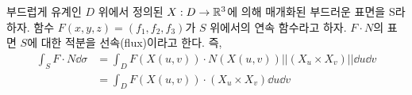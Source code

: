 \begin{definition}[3차원 벡터장의 선속]
부드럽게 유계인 $D$ 위에서 정의된 $X:D\to\mathbb{R}^3$에 의해 매개화된 부드러운 표면을 S라 하자. 함수 $F(x,y,z)=(f_1,f_2,f_3)$가 $S$ 위에서의 연속 함수라고 하자. $F \cdot N$의 표면 $S$에 대한 적분을 선속(flux)이라고 한다. 즉,
\begin{align*}
\int_S F\cdot N \dd \sigma
&= \int_D F(X(u,v))\cdot N(X(u,v))||(X_u\times X_v)||\dd u\dd v\\
&= \int_D F(X(u,v))\cdot(X_u\times X_v)\dd u\dd v    
\end{align*}
\end{definition}
